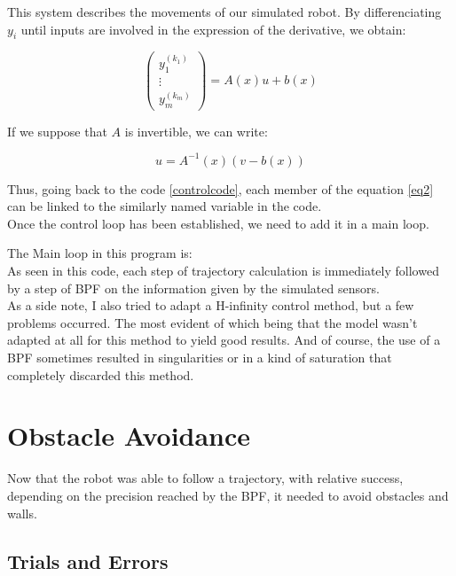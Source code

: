 This system describes the movements of our simulated robot. By differenciating $y_i$ until inputs are involved in the expression of the derivative, we obtain:

\begin{equation}
  \begin{pmatrix}
    y_{1}^{(k_1)} \\
    \vdots \\
    y_{m}^{(k_m)}
  \end{pmatrix}
  = A(x)u + b(x)
\end{equation}

If we suppose that $A$ is invertible, we can write:

\begin{equation}
  \label{eq2}
  u = A^{-1}(x)(v - b(x))
\end{equation}

Thus, going back to the code \ref{controlcode}, each member of the equation \ref{eq2} can be linked to the similarly named variable in the code.\\

Once the control loop has been established, we need to add it in a main loop.

The Main loop in this program is:\\



As seen in this code, each step of trajectory calculation is immediately followed by a step of BPF on the information given by the simulated sensors. \\


As a side note, I also tried to adapt a H-infinity control method, but a few problems occurred.
The most evident of which being that the model wasn't adapted at all for this method to yield good results.
And of course, the use of a BPF sometimes resulted in singularities or in a kind of saturation that completely discarded this method.


\section{Obstacle Avoidance}
Now that the robot was able to follow a trajectory, with relative success, depending on the precision reached by the BPF, it needed to avoid obstacles and walls.


\subsection{Trials and Errors}

